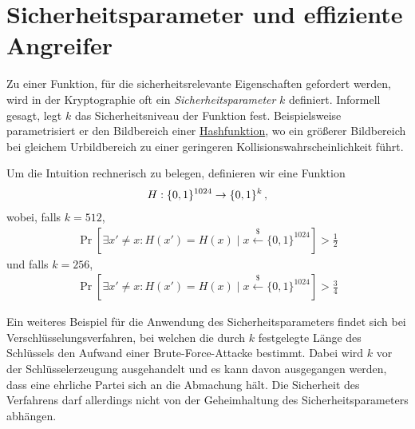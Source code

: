 \section{Sicherheitsparameter und effiziente Angreifer}\label{sec:secparam}
Zu einer Funktion, für die sicherheitsrelevante Eigenschaften gefordert werden, wird in der Kryptographie oft ein \emph{Sicherheitsparameter} $k$ definiert. Informell gesagt, legt $k$ das Sicherheitsniveau der Funktion fest. Beispielsweise parametrisiert er den Bildbereich einer \hyperref[cha:hash]{Hashfunktion}, wo ein größerer Bildbereich bei gleichem Urbildbereich zu einer geringeren Kollisionswahrscheinlichkeit führt.
\begin{beispiel}
	Um die Intuition rechnerisch zu belegen, definieren wir eine Funktion
	\begin{align*}
		H : \{0, 1\}^{1024} \rightarrow \{0, 1\}^{k}\, ,
	\end{align*}
	wobei, falls $k = 512$,
	\begin{align*}
		\Pr \left[ \exists x' \neq x : H(x') = H(x) \mid x \stackrel{\$}{\longleftarrow} \{0, 1\}^{1024} \right] > \frac{1}{2}
	\end{align*}
	und falls $k = 256$,
	\begin{align*}
		\Pr \left[ \exists x' \neq x : H(x') = H(x) \mid x \stackrel{\$}{\longleftarrow} \{0, 1\}^{1024} \right] > \frac{3}{4}
	\end{align*}
\end{beispiel}
Ein weiteres Beispiel für die Anwendung des Sicherheitsparameters findet sich bei Verschlüsselungsverfahren, bei welchen die durch $k$ festgelegte Länge des Schlüssels den Aufwand einer Brute-Force-Attacke bestimmt. Dabei wird $k$ vor der Schlüsselerzeugung ausgehandelt und es kann davon ausgegangen werden, dass eine ehrliche Partei sich an die Abmachung hält.
Die Sicherheit des Verfahrens darf allerdings nicht von der Geheimhaltung des Sicherheitsparameters abhängen. 

